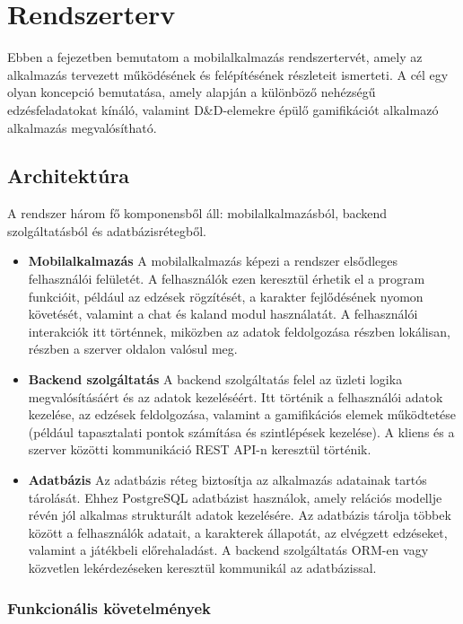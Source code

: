 \documentclass[
]{thesis-ekf}
\theoremstyle{definition}
\theoremstyle{remark}
\begin{document}
\chapter{Rendszerterv}
Ebben a fejezetben bemutatom a mobilalkalmazás rendszertervét, amely az alkalmazás tervezett működésének és felépítésének részleteit ismerteti. A cél egy olyan koncepció bemutatása, amely alapján a különböző nehézségű edzésfeladatokat kínáló, valamint D\&D-elemekre épülő gamifikációt alkalmazó alkalmazás megvalósítható.

\section{Architektúra}

A rendszer három fő komponensből áll: mobilalkalmazásból, backend
szolgáltatásból és adatbázisrétegből.

\begin{itemize}
    \item 
    \textbf{Mobilalkalmazás} A mobilalkalmazás képezi a rendszer elsődleges felhasználói felületét. A felhasználók ezen keresztül érhetik el a program funkcióit, például az edzések rögzítését, a karakter fejlődésének nyomon követését, valamint a chat és kaland modul használatát. A felhasználói interakciók itt történnek, miközben az adatok feldolgozása részben lokálisan, részben a szerver oldalon valósul meg.

    \item
    \textbf{Backend szolgáltatás} A backend szolgáltatás felel az üzleti logika megvalósításáért és az adatok kezeléséért. Itt történik a felhasználói adatok kezelése, az edzések feldolgozása, valamint a gamifikációs elemek működtetése (például tapasztalati pontok számítása és szintlépések kezelése). A kliens és a szerver közötti kommunikáció REST API-n keresztül történik.

    \item
    \textbf{Adatbázis} Az adatbázis réteg biztosítja az alkalmazás adatainak tartós tárolását. Ehhez PostgreSQL adatbázist használok, amely relációs modellje révén jól alkalmas strukturált adatok kezelésére. Az adatbázis tárolja többek között a felhasználók adatait, a karakterek állapotát, az elvégzett edzéseket, valamint a játékbeli előrehaladást. A backend szolgáltatás ORM-en vagy közvetlen lekérdezéseken keresztül kommunikál az adatbázissal.


\end{itemize}

\subsection{Funkcionális követelmények}
\end{document}
